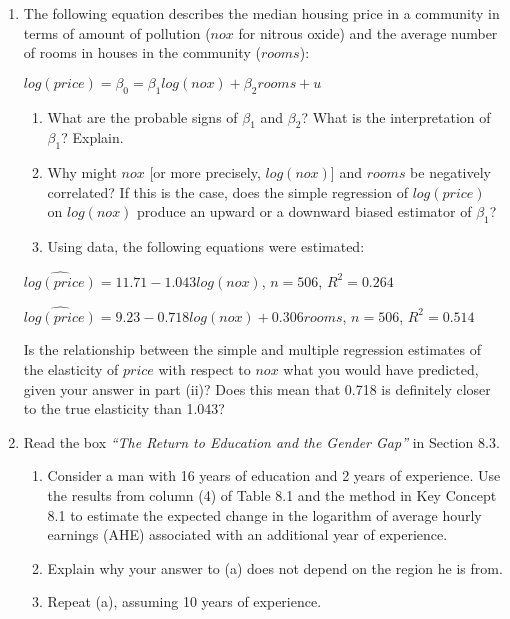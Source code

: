 \documentclass[11pt]{article}
\begin{document}
\begin{enumerate}
\def\labelenumi{\arabic{enumi}.}

\item
  The following equation describes the median housing price in a
  community in terms of amount of pollution (\(nox\) for nitrous oxide)
  and the average number of rooms in houses in the community
  (\(rooms\)):


\(log(price) = \beta_0 = \beta_1log(nox) + \beta_2rooms + u\)

\begin{enumerate}
\def\labelenumi{\alph{enumi}.}

\item
  What are the probable signs of \(\beta_1\) and \(\beta_2\)? What is
  the interpretation of \(\beta_1\)? Explain.
\item
  Why might \(nox\) {[}or more precisely, \(log(nox)\){]} and \(rooms\)
  be negatively correlated? If this is the case, does the simple
  regression of \(log(price)\) on \(log(nox)\) produce an upward or a
  downward biased estimator of \(\beta_1\)?
\item
  Using data, the following equations were estimated:
\end{enumerate}

\(\widehat{log(price)} = 11.71 - 1.043 log(nox)\), \(n = 506\),
\(R^2 = 0.264\)

\(\widehat{log(price)} = 9.23 - 0.718 log(nox) + 0.306 rooms\),
\(n = 506\), \(R^2 = 0.514\)

Is the relationship between the simple and multiple regression estimates
of the elasticity of \(price\) with respect to \(nox\) what you would
have predicted, given your answer in part (ii)? Does this mean that
0.718 is definitely closer to the true elasticity than 1.043?


\item   Read the box \emph{``The Return to Education and the Gender Gap''} in
  Section 8.3.


\begin{enumerate}
\def\labelenumi{\alph{enumi}.}

\item
  Consider a man with 16 years of education and 2 years of experience.
  Use the results from column (4) of Table 8.1 and the method in Key
  Concept 8.1 to estimate the expected change in the logarithm of
  average hourly earnings (AHE) associated with an additional year of
  experience.
\item
  Explain why your answer to (a) does not depend on the region he is
  from.
\item
  Repeat (a), assuming 10 years of experience.
\end{enumerate}



\end{enumerate}
\end{document}
